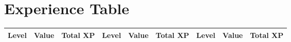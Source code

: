\section{Experience Table}\label{sec:app-tab-xp}

\begin{center}
\begin{longtable}{DDD|DDD|DDD}
    \hline Level & Value & Total XP & Level & Value & Total XP & Level & Value & Total XP \\ \hline \endhead%


\end{longtable}
\end{center}
